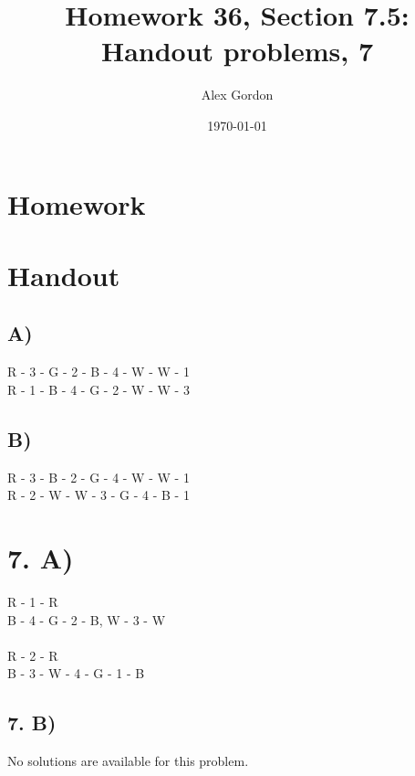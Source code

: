 \documentclass[12]{scrartcl}
\begin{document}
\title{Homework 36, Section 7.5: Handout problems, 7}
\author{Alex Gordon}
\date{\today}
\maketitle
\section*{Homework}
\section*{Handout}
\subsection*{A)}

R - 3 - G - 2 - B - 4 - W - W - 1 \\
R - 1 - B - 4 - G - 2 - W - W - 3

\subsection*{B)}
R - 3 - B - 2 - G - 4 - W - W - 1\\
R - 2 - W - W - 3 - G - 4 - B - 1

\section*{7. A)}
R - 1 - R\\
B - 4 - G - 2 - B, W - 3 - W\\
\\
R - 2 - R\\
B - 3 - W - 4 - G - 1 - B

\subsection*{7. B)}
No solutions are available for this problem. 
\end{document}
